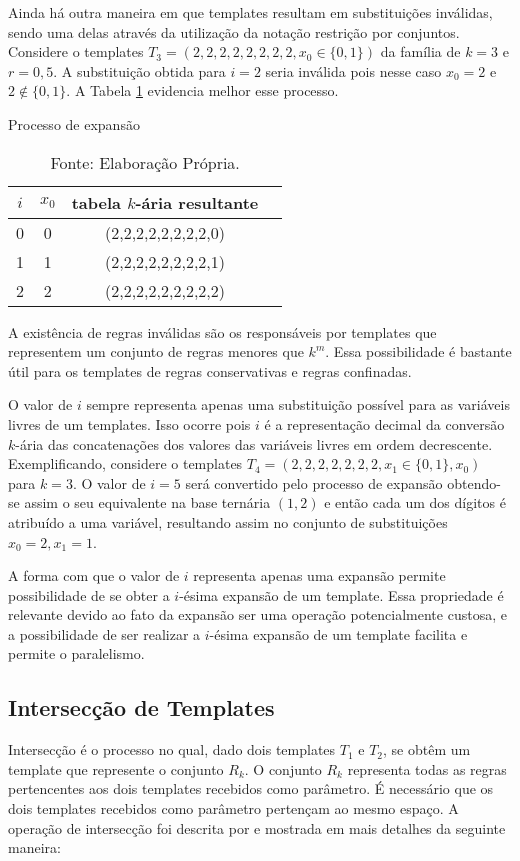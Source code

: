Ainda há outra maneira em que templates resultam em substituições inválidas, sendo uma delas através da utilização da notação restrição por conjuntos. Considere o templates $T_3 = (2,2,2,2,2,2,2,2,x_0\in \{0,1\})$ da família de $k=3$ e $r=0{,}5$. %
A substituição obtida para $i = 2$ seria inválida pois nesse caso $x_0 = 2$ e $2 \notin \{0,1\}$. A Tabela \ref{tab:invalideExpansion2} evidencia melhor esse processo.
\begin{table}[h!]
\centering
\caption{Processo de expansão}
	\begin{tabular}{cccc}
    \toprule
	$i$ & $x_0$ & tabela $k$-ária resultante \\
    \midrule
	0	&	0	&	(2,2,2,2,2,2,2,2,0)	\\
	1	&	1	&	(2,2,2,2,2,2,2,2,1)	\\
	2	&	2	&	(2,2,2,2,2,2,2,2,2)	\\
    \bottomrule
	\end{tabular}
\caption*{Fonte: Elaboração Própria.}
\label{tab:invalideExpansion2}
\end{table}

A existência de regras inválidas são os responsáveis por templates que representem um conjunto de regras menores que $k^m$. Essa possibilidade é bastante útil para os templates de regras conservativas e regras confinadas.

O valor de $i$ sempre representa apenas uma substituição possível para as variáveis livres de um templates. Isso ocorre pois $i$ é a representação decimal da conversão $k$-ária das concatenações dos valores das variáveis livres em ordem decrescente. Exemplificando, considere o templates $T_4 = (2,2,2,2,2,2,2,x_1\in \{0,1\},x_0)$ para $k=3$. O valor de $i=5$ será convertido pelo processo de expansão obtendo-se assim o seu equivalente na base ternária $(1,2)$ e então cada um dos dígitos é atribuído a uma variável, resultando assim no conjunto de substituições ${x_0=2,x_1=1}$.

A forma com que o valor de $i$ representa apenas uma expansão permite possibilidade de se obter a $i$-ésima expansão de um template. Essa propriedade é relevante devido ao fato da expansão ser uma operação potencialmente custosa, e a possibilidade de ser realizar a $i$-ésima expansão de um template facilita e permite o paralelismo.

\newpage\newpage
\subsection{Intersecção de Templates}
Intersecção é o processo no qual, dado dois templates $T_1$ e $T_2$, se obtêm um template que represente o conjunto $R_k$. O conjunto $R_k$ representa todas as regras pertencentes aos dois templates recebidos como parâmetro. É necessário que os dois templates recebidos como parâmetro pertençam ao mesmo espaço. A operação de intersecção foi descrita por  e mostrada em mais detalhes da seguinte maneira:

